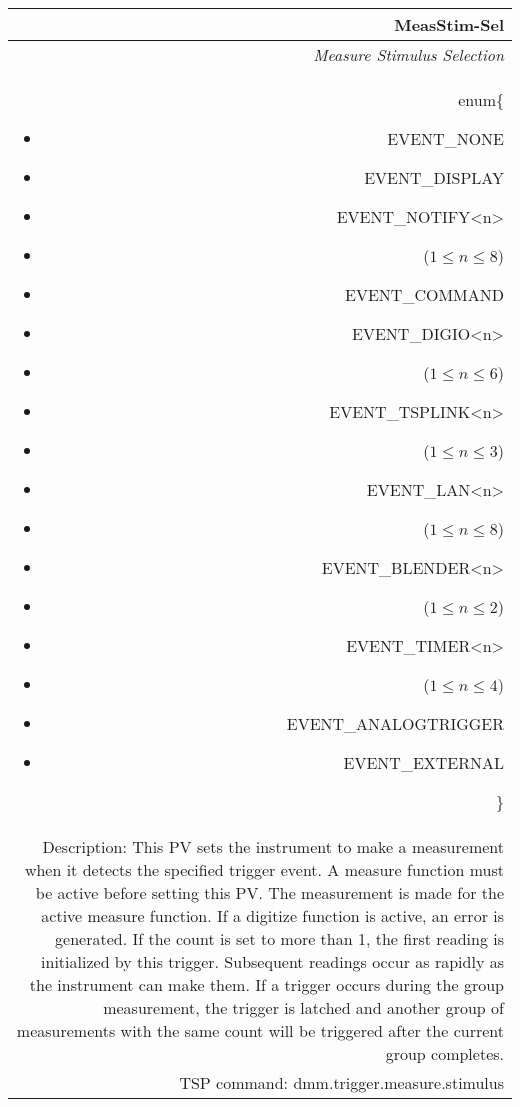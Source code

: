 \documentclass[openany]{article}
\begin{document}
		\begin{tabular}{N}
			\hline
			\bfseries MeasStim-Sel\label{pv:measstim-sel} \\ \hline
			\emph{Measure Stimulus Selection} \\
			enum\{\begin{itemize}[noitemsep]
				\small
				\item[] EVENT\_NONE
				\item[] EVENT\_DISPLAY
				\item[] EVENT\_NOTIFY\textless n\textgreater
				\item[] ($1\leq n\leq 8$)
				\item[] EVENT\_COMMAND
				\item[] EVENT\_DIGIO\textless n\textgreater
				\item[] ($1\leq n\leq 6$)
				\item[] EVENT\_TSPLINK\textless n\textgreater
				\item[] ($1\leq n\leq 3$)
				\item[] EVENT\_LAN\textless n\textgreater
				\item[] ($1\leq n\leq 8$)
				\item[] EVENT\_BLENDER\textless n\textgreater 
				\item[] ($1\leq n\leq 2$)
				\item[] EVENT\_TIMER\textless n\textgreater
				\item[] ($1\leq n\leq 4$)
				\item[] EVENT\_ANALOGTRIGGER
				\item[] EVENT\_EXTERNAL
			\end{itemize}\} \\
			Description: This PV sets the instrument to make a measurement when it detects the specified trigger event. A measure function must be active before setting this PV. The measurement is made for the active measure function. If a digitize function is active, an error is generated. If the count is set to more than 1, the first reading is initialized by this trigger. Subsequent readings occur as rapidly as the instrument can make them. If a trigger occurs during the group measurement, the trigger is latched and another group of measurements with the same count will be triggered after the current group completes. \\
			TSP command: dmm.trigger.measure.stimulus
		\end{tabular}
\end{document}

